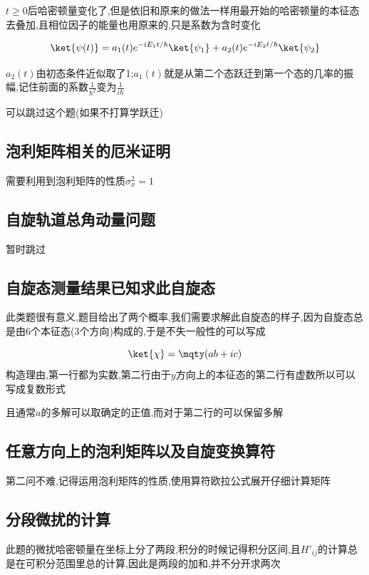             $t \ge 0$后哈密顿量变化了,但是依旧和原来的做法一样用最开始的哈密顿量的本征态去叠加,且相位因子的能量也用原来的,只是系数为含时变化

            $$
            \ket{\psi(t)} = a_{1}(t) e^{-iE_{1}t/\hbar}\ket{\psi_{1}} + a_{2}(t)e^{-iE_{2}t/\hbar}\ket{\psi_{2}}
            $$

            $a_{2}(t)$由初态条件近似取了1;$a_{1}(t)$就是从第二个态跃迁到第一个态的几率的振幅,记住前面的系数$\frac{1}{\hbar^{2}}$变为$\frac{1}{i \hbar}$

            可以跳过这个题(如果不打算学跃迁)

        \subsection{泡利矩阵相关的厄米证明}
            需要利用到泡利矩阵的性质$\sigma_{x}^{2} = 1$

        \subsection{自旋轨道总角动量问题}
            暂时跳过

        \subsection{自旋态测量结果已知求此自旋态}
            此类题很有意义,题目给出了两个概率,我们需要求解此自旋态的样子,因为自旋态总是由6个本征态(3个方向)构成的,于是不失一般性的可以写成

            $$
            \ket{\chi} = \mqty( a \\ b+ic )
            $$
            构造理由,第一行都为实数,第二行由于$y$方向上的本征态的第二行有虚数所以可以写成复数形式

            且通常$a$的多解可以取确定的正值,而对于第二行的可以保留多解

        \subsection{任意方向上的泡利矩阵以及自旋变换算符}
            第二问不难,记得运用泡利矩阵的性质,使用算符欧拉公式展开仔细计算矩阵

        \subsection{分段微扰的计算}
            此题的微扰哈密顿量在坐标上分了两段,积分的时候记得积分区间,且$H'_{ij}$的计算总是在可积分范围里总的计算,因此是两段的加和,并不分开求两次


